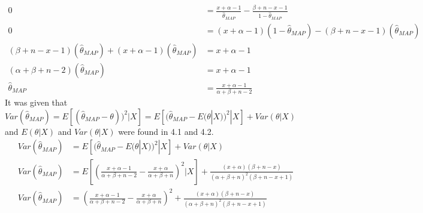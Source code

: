 \documentclass[11pt]{article}
\begin{document}
\begin{align*}
0 &=\frac{x+\alpha-1}{\hat{\theta}_{MAP}}-\frac{\beta+n-x-1}{1-\hat{\theta}_{MAP}} \\
0 &=(x+\alpha-1)(1-\hat{\theta}_{MAP})-(\beta+n-x-1)(\hat{\theta}_{MAP}) \\
(\beta+n-x-1)(\hat{\theta}_{MAP})+(x+\alpha-1)(\hat{\theta}_{MAP}) &= x+\alpha-1 \\
(\alpha+\beta+n-2)(\hat{\theta}_{MAP}) &= x+\alpha-1 \\
\hat{\theta}_{MAP} &= \frac{x+\alpha-1}{\alpha+\beta+n-2} 
\end{align*}
It was given that $Var(\hat{\theta}_{MAP})=E[(\hat{\theta}_{MAP}-\theta))^2|X]=E[(\hat{\theta}_{MAP}-E(\theta|X))^2|X]+Var(\theta|X)$ and $E(\theta|X)$ and $Var(\theta|X)$ were found in 4.1 and 4.2. 
\begin{align*}
Var(\hat{\theta}_{MAP}) &= E\left[(\hat{\theta}_{MAP}-E(\theta|X))^2|X\right]+Var\left(\theta|X\right) \\
Var(\hat{\theta}_{MAP}) &= E\left[\left(\frac{x+\alpha-1}{\alpha+\beta+n-2} -\frac{x+ \alpha}{\alpha+\beta+n}\right)^2|X\right]+\frac{(x+ \alpha)(\beta+n-x)}{(\alpha+\beta+n)^2(\beta+n-x+1)} \\
Var(\hat{\theta}_{MAP}) &= \left(\frac{x+\alpha-1}{\alpha+\beta+n-2} -\frac{x+ \alpha}{\alpha+\beta+n}\right)^2+\frac{(x+ \alpha)(\beta+n-x)}{(\alpha+\beta+n)^2(\beta+n-x+1)}
\end{align*}
\end{document}
